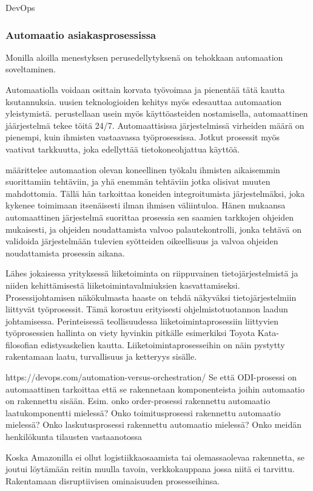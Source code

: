 \documentclass[finnish,12pt,a4paper,pdftex]{article}
\begin{document}
DevOps
\subsubsection{Automaatio asiakasprosessissa}

Monilla aloilla menestyksen perusedellytyksenä on tehokkaan automaation soveltaminen. 

Automaatiolla voidaan osittain korvata työvoimaa ja pienentää tätä kautta ksutannuksia. 
uusien teknologioiden kehitys myös edesauttaa automaation yleistymistä.
perustellaan usein myös käyttöasteiden nostamisella, automaattinen jåärjestelmä tekee töitä 24/7.
Automaattisissa järjestelmissä virheiden määrä on pienempi, kuin ihmisten vastaavassa työprosessissa.
Jotkut prosessit myös vaativat tarkkuutta, joka edellyttää tietokoneohjattua käyttöä.

\cite{groover} määrittelee automaation olevan koneellinen työkalu ihmisten aikaisemmin suorittamiin tehtäviin, ja yhä enemmän tehtäviin jotka olisivat muuten mahdottomia. Tällä hän tarkoittaa koneiden integroitumista järjestelmäksi, joka kykenee toimimaan itsenäisesti ilman ihmisen väliintuloa. Hänen mukaansa automaattinen järjestelmä suorittaa prosessia sen saamien tarkkojen ohjeiden mukaisesti, ja ohjeiden noudattamista valvoo palautekontrolli, jonka tehtävä on validoida järjestelmään tulevien syötteiden oikeellisuus ja valvoa ohjeiden noudattamista prosessin aikana. 

Lähes jokaisessa yrityksessä liiketoiminta on riippuvainen tietojärjestelmistä ja niiden kehittämisestä liiketoimintavalmiuksien kasvattamiseksi. Prosessijohtamisen näkökulmasta haaste on tehdä näkyväksi tietojärjestelmiin liittyvät työprosessit. Tämä korostuu erityisesti ohjelmistotuotannon laadun johtamisessa. Perinteisessä teollisuudessa liiketoimintaprosessiin liittyvien työprosessien hallinta on viety hyvinkin pitkälle esimerkiksi Toyota Kata-filosofian edistysaskelien kautta. Liiketoimintaprosesseihin on näin pystytty rakentamaan laatu, turvallisuus ja ketteryys sisälle. 


https://devops.com/automation-versus-orchestration/ 
Se että ODI-prosessi on automaattinen tarkoittaa että se rakennetaan komponenteista joihin automaatio on rakennettu sisään. Esim. onko order-prosessi rakennettu automaatio laatukomponentti mielessä? Onko toimitusprosessi rakennettu automaatio mielessä? Onko laskutusprosessi rakennettu automaatio mielessä?
Onko meidän henkilökunta tilausten vastaanotossa 

Koska Amazonilla ei ollut logistiikkaosaamista tai olemassaolevaa rakennetta, se joutui löytämään reitin muulla tavoin, verkkokauppana jossa niitä ei tarvittu. Rakentamaan disruptiivisen ominaisuuden prosesseihinsa.
\end{document}
